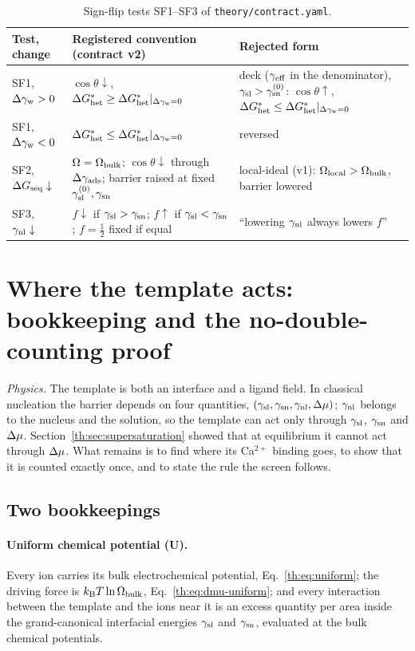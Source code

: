\begin{table}[h]
\centering\small
\begin{tabular}{@{}l >{\raggedright\arraybackslash}p{} >{\raggedright\arraybackslash}p{}@{}}
\hline
Test, change & Registered convention (contract v2) & Rejected form\\
\hline
SF1, $\Delta\gamma_\mathrm{w}>0$ & $\cos\theta\downarrow$, $\Delta G^{*}_\mathrm{het}\ge\Delta G^{*}_\mathrm{het}|_{\Delta\gamma_\mathrm{w}=0}$ & deck ($\gamma_\mathrm{eff}$ in the denominator), $\gamma_\mathrm{sl}>\gamma_\mathrm{sn}^{(0)}$: $\cos\theta\uparrow$, $\Delta G^{*}_\mathrm{het}\le\Delta G^{*}_\mathrm{het}|_{\Delta\gamma_\mathrm{w}=0}$\\
SF1, $\Delta\gamma_\mathrm{w}<0$ & $\Delta G^{*}_\mathrm{het}\le\Delta G^{*}_\mathrm{het}|_{\Delta\gamma_\mathrm{w}=0}$ & reversed\\
SF2, $\Delta G_\mathrm{seq}\downarrow$ & $\Omega=\Omega_\mathrm{bulk}$; $\cos\theta\downarrow$ through $\Delta\gamma_\mathrm{ads}$; barrier raised at fixed $\gamma_\mathrm{sl}^{(0)},\gamma_\mathrm{sn}$ & local-ideal (v1): $\Omega_\mathrm{local}>\Omega_\mathrm{bulk}$, barrier lowered\\
SF3, $\gamma_\mathrm{nl}\downarrow$ & $f\downarrow$ if $\gamma_\mathrm{sl}>\gamma_\mathrm{sn}$; $f\uparrow$ if $\gamma_\mathrm{sl}<\gamma_\mathrm{sn}$; $f=\tfrac12$ fixed if equal & ``lowering $\gamma_\mathrm{nl}$ always lowers $f$''\\
\hline
\end{tabular}
\caption{Sign-flip tests SF1--SF3 of \texttt{theory/contract.yaml}.}\label{th:tab:signflip}
\end{table}

\section{Where the template acts: bookkeeping and the no-double-counting proof}\label{th:sec:template}

\textit{Physics.} The template is both an interface and a ligand field. In classical nucleation
the barrier depends on four quantities, $(\gamma_\mathrm{sl},\gamma_\mathrm{sn},\gamma_\mathrm{nl},\Delta\mu)$; $\gamma_\mathrm{nl}$ belongs to the nucleus
and the solution, so the template can act only through $\gamma_\mathrm{sl}$, $\gamma_\mathrm{sn}$ and $\Delta\mu$.
Section~\ref{th:sec:supersaturation} showed that at equilibrium it cannot act through $\Delta\mu$. What
remains is to find where its Ca$^{2+}$ binding goes, to show that it is counted exactly once, and
to state the rule the screen follows.

\subsection{Two bookkeepings}\label{th:sec:bookkeeping}

\paragraph{Uniform chemical potential (U).} Every ion carries its bulk electrochemical potential,
Eq.~\eqref{th:eq:uniform}; the driving force is $k_\mathrm{B} T\ln\Omega_\mathrm{bulk}$, Eq.~\eqref{th:eq:dmu-uniform}; and
every interaction between the template and the ions near it is an excess quantity per area inside
the grand-canonical interfacial energies $\gamma_\mathrm{sl}$ and $\gamma_\mathrm{sn}$, evaluated at the bulk chemical
potentials.


